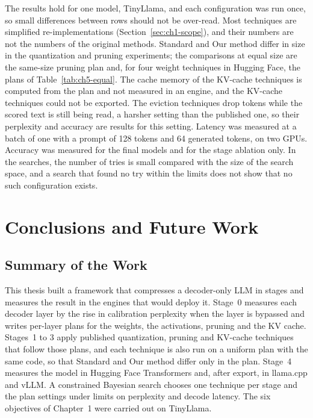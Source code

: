 \documentclass[
11pt, %
english, %
singlespacing, %
headsepline, %
]{MastersDoctoralThesis} %
\begin{document}
The results hold for one model, TinyLlama, and each configuration was run once, so small differences between rows should not be over-read. Most techniques are simplified re-implementations (Section~\ref{sec:ch1-scope}), and their numbers are not the numbers of the original methods. Standard and Our method differ in size in the quantization and pruning experiments; the comparisons at equal size are the same-size pruning plan and, for four weight techniques in Hugging Face, the plans of Table~\ref{tab:ch5-equal}. The cache memory of the KV-cache techniques is computed from the plan and not measured in an engine, and the KV-cache techniques could not be exported. The eviction techniques drop tokens while the scored text is still being read, a harsher setting than the published one, so their perplexity and accuracy are results for this setting. Latency was measured at a batch of one with a prompt of 128 tokens and 64 generated tokens, on two GPUs. Accuracy was measured for the final models and for the stage ablation only. In the searches, the number of tries is small compared with the size of the search space, and a search that found no try within the limits does not show that no such configuration exists.
\clearpage
\chapter{Conclusions and Future Work}
\label{Chapter6}

\section{Summary of the Work}
\label{sec:ch6-summary}

This thesis built a framework that compresses a decoder-only LLM in stages and measures the result in the engines that would deploy it. Stage~0 measures each decoder layer by the rise in calibration perplexity when the layer is bypassed and writes per-layer plans for the weights, the activations, pruning and the KV cache. Stages~1 to 3 apply published quantization, pruning and KV-cache techniques that follow those plans, and each technique is also run on a uniform plan with the same code, so that Standard and Our method differ only in the plan. Stage~4 measures the model in Hugging Face Transformers and, after export, in llama.cpp and vLLM. A constrained Bayesian search chooses one technique per stage and the plan settings under limits on perplexity and decode latency. The six objectives of Chapter~1 were carried out on TinyLlama.
\end{document}
